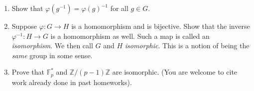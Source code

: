 \documentclass[11pt]{article}
\newcommand{\bF}{\mathbb{F}}
\newcommand{\bZ}{\mathbb{Z}}
\begin{document}
\begin{enumerate}
{\begin{enumerate}
{    Let $g\in G$.  Recall that an inverse to $g$ is an element $g^{-1}$ such that $g*g^{-1} = g^{-1}*g=1$.  Show that $g^{-1}$ is unique.
    }
    \item{
    Show that $\varphi(g^{-1})=\varphi(g)^{-1}$ for all $g\in G$.
    }
    \item{
    Suppose $\varphi:G\to H$ is a homomorphism and is bijective.  Show that the inverse $\varphi^{-1}:H\to G$ is a homomorphism as well.  Such a map is called an \textit{isomorphism}.  We then call $G$ and $H$ \textit{isomorphic}.  This is a notion of being the \textit{same} group in some sense.
    }
    \item{
    Prove that $\bF_p^*$ and $\bZ/(p-1)\bZ$ are isomorphic.  (You are welcome to cite work already done in past homeworks).
    }
  \end{enumerate}
  }
\end{enumerate}
\end{document}
